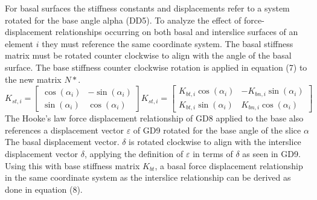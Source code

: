 \documentclass[12pt]{article}
\begin{document}
For basal surfaces the stiffness constants and displacements refer to a system rotated for the base angle alpha (DD5). To analyze the effect of force-displacement relationships occurring on both basal and interslice surfaces of an element $i$ they must reference the same coordinate system. The basal stiffness matrix must be rotated counter clockwise to align with the angle of the basal surface. The base stiffness counter clockwise rotation is applied in equation (7) to the new matrix $N*$.
\begin{dmath}
{K_{st,i}}=\begin{bmatrix}
\cos\left(\alpha{}_{i}\right) & -\sin\left(\alpha{}_{i}\right)\\
\sin\left(\alpha{}_{i}\right) & \cos\left(\alpha{}_{i}\right)
\end{bmatrix} {K_{st,i}}=\begin{bmatrix}
{K_{bt,i}} \cos\left(\alpha{}_{i}\right) & -{K_{bn,i}} \sin\left(\alpha{}_{i}\right)\\
{K_{bt,i}} \sin\left(\alpha{}_{i}\right) & {K_{bn,i}} \cos\left(\alpha{}_{i}\right)
\end{bmatrix}
\end{dmath}
The Hooke's law force displacement relationship of GD8 applied to the base also references a displacement vector $\varepsilon{}$ of GD9 rotated for the base angle of the slice $\alpha{}$ The basal displacement vector. $\delta{}$ is rotated clockwise to align with the interslice displacement vector $\delta{}$, applying the definition of $\varepsilon{}$ in terms of $\delta{}$ as seen in GD9. Using this with base stiffness matrix ${K_{bt}}$, a basal force displacement relationship in the same coordinate system as the interslice relationship can be derived as done in equation (8).
\end{document}
